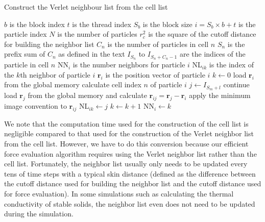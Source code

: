 \documentclass[12pt,a4paper]{report}
\newcommand{\vect}[1]{\boldsymbol{#1}}
\begin{document}
\begin{algorithm}[htb]
\caption{Construct the Verlet neighbour list from the cell list}
\label{algorithm:convert}
\begin{algorithmic}[1]
\Require $b$ is the block index
\Require $t$ is the thread index
\Require $S_b$ is the block size
\Require $i=S_b\times b+t$ is the particle index
\Require $N$ is the number of particles
\Require $r_c^2$ is the square of the cutoff distance for building the neighbor list
\Require $C_n$ is the number of particles in cell $n$
\Require $S_n$ is the prefix sum of $C_n$ as defined in the text
\Require $I_{S_n}$ to $I_{S_n + C_n - 1}$ are the indices of the particle in cell $n$
\Require NN$_{i}$ is the number neighbors for particle $i$
\Require NL$_{ik}$ is the index of the $k$th neighbor of particle $i$
\Require $\vect{r}_{i}$ is the position vector of particle $i$
\State $k\leftarrow 0$
    \State load $\vect{r}_{i}$ from the global memory
    \State calculate cell index $n$ of particle $i$
            \State $j \leftarrow I_{S_m + l} $
                \State continue
            \EndIf
            \State load $\vect{r}_{j}$ from the global memory and calculate
               $\vect{r}_{ij} = \vect{r}_{j} - \vect{r}_{i}$
            \State apply the minimum image convention to $\vect{r}_{ij}$
            \If {$|\vect{r}_{ij}|^2 < r_c^2$}
                \State NL$_{ik}\leftarrow j$
                \State $k\leftarrow k+1$
            \EndIf
        \EndFor
        \State NN$_{i}\leftarrow k$
    \EndFor
\EndIf
 \end{algorithmic}
\end{algorithm}

We note that the computation time used for the construction of the cell list is negligible compared to that used for the construction of the Verlet neighbor list from the cell list. However, we have to do this conversion because our efficient force evaluation algorithm \cite{fan2017cpc} requires using the Verlet neighbor list rather than the cell list. Fortunately, the neighbor list usually only needs to be updated every tens of time steps with a typical skin distance (defined as the difference between the cutoff distance used for building the neighbor list and the cutoff distance used for force evaluation). In some simulations such as calculating the thermal conductivity of stable solids, the neighbor list even does not need to be updated during the simulation.
\end{document}
